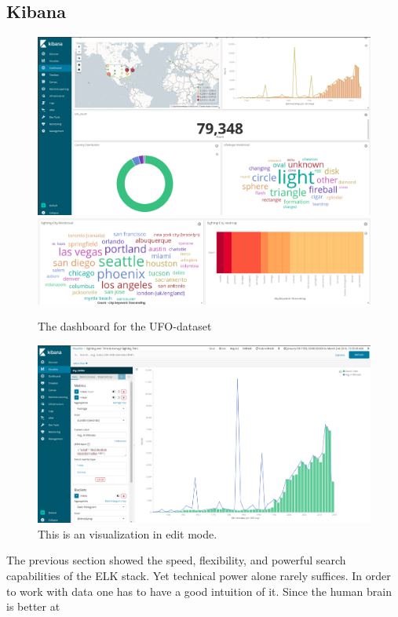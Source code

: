 \documentclass[bibliography=totoc]{article}
\begin{document}
\subsection{Kibana}
\begin{figure}
   \includegraphics[height=0.5\textwidth]{dashboard1.png} 
   \includegraphics[height=0.242\textwidth]{dashboard2.png} 
   \caption{\label{ufo_dashboard}The dashboard for the UFO-dataset}
\end{figure}
\begin{figure}
   \includegraphics[height=0.5\textwidth]{kibana_script.png} 
   \caption{\label{json_script}This is an visualization in edit mode.}
\end{figure}
The previous section showed the speed, flexibility, and powerful search capabilities
of the ELK stack. Yet technical power alone rarely suffices. In order to work with data 
one has to have a good intuition of it. Since the human brain is better at 
\end{document}
